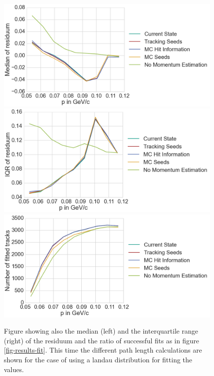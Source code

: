 \begin{figure}
  \centering
  \includegraphics[width=0.48\linewidth]{figures/vxd/landauKalman0_3Median.png}
  \includegraphics[width=0.48\linewidth]{figures/vxd/landauKalman0_3IQR.png}
  \includegraphics[width=0.48\linewidth]{figures/vxd/landauKalman0_3Count.png}
  \caption[Residuum of the momentum estimation for different path length calculations.]{Figure showing also the median (left) and the interquartile range (right) of the residuum and the ratio of successful fits as in figure \ref{fig-results-fit}. This time the different path length calculations are shown for the case of using a landau distribution for fitting the \dedx values.}
  \label{fig-results-fit2}
\end{figure}

